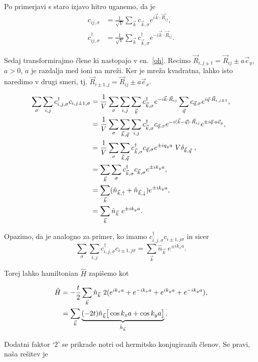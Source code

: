 \documentclass[a4paper, 12pt]{article}
\newcommand{\vq}{
	\ensuremath{\vec{q}}
}
\renewcommand{\u}{
	\ensuremath{\uparrow}
}
\renewcommand{\d}{
	\ensuremath{\downarrow}
}
\newcommand{\oh}{
	\ensuremath{\hat{h}}
}
\newcommand{\vk}{
	\ensuremath{\vec{k}}
}
\newcommand{\koren}{
	\ensuremath{\frac{1}{\sqrt{V}}}
}
\newcommand{\vR}{
	\ensuremath{\vec{R}_{ij}}
}
\newcommand{\s}{
	\ensuremath{\sigma}
}
\newcommand{\ey}{
	\ensuremath{\vec{e}_y}
}
\newcommand{\fV}{
	\ensuremath{\frac{1}{V}}
}
\renewcommand{\ni}{
	\noindent
}
\begin{document}
\ni Po primerjavi s staro izjavo hitro uganemo, da je
\begin{align}
	c_{ij,\sigma} &= \koren \sum_{\vk} c_{\vk,\sigma} e^{i\vk\cdot\vec{R}_{ij}}, \\
	c^\dagger_{ij,\sigma} &= \koren \sum_{\vk} c^\dagger_{\vk, \sigma} e^{-i\vk\cdot\vec{R}_{ij}}.
\end{align}

\ni Sedaj transformirajmo \v clene ki nastopajo v en.~\eqref{oh}. Recimo $\vec{R}_{i,j\pm1} = \vec{R}_{ij}
\pm a\vec{e}_y$, $a > 0$, $a$ je razdalja med ioni na mre\v zi. Ker je mre\v za kvadratna, lahko
isto naredimo v drugi smeri, tj. $\vec{R}_{i\pm1, j} = \vec{R}_{ij} \pm a\vec{e}_x$.

\begin{align}
	\sum_\s\sum_{i,j} c^\dagger_{i,j,\sigma}c_{i,j \pm 1,\sigma} 
	&=\fV \sum_\s\sum_{i,j}\sum_{\vk} c^\dagger_{\vk,\s} e^{-i\vk \cdot \vR}
		\sum_{\vq}c_{\vq,\s} e^{i\vq\cdot\vec{R}_{i,j \pm 1}}, \notag \\
	&=\fV \sum_\s \sum_{\vk,\vq} \sum_{i,j}c^\dagger_{\vk,\s} c_{\vq,\s} e^{-i(\vk - \vq)\cdot \vR}
		e^{\pm i\vq \cdot a \ey}, \notag \\
	&=\fV \sum_\s \sum_{\vk, \vq} c^\dagger_{\vk, \s} c_{\vq, \s} e^{\pm i q_y a}\ 
		V \delta_{\vk,\vq}\ ,\notag \\
	&= \sum_{\vk} \sum_\s c^\dagger_{\vk, \s} c_{\vk, \s} e^{\pm ik_y a}, \notag \\
	&= \sum_{\vk} (\hat{n}_{\vk,\u} + \hat{n}_{\vk,\d})e^{\pm ik_y a}, \notag \\
	&= \sum_{\vk} \hat{n}_{\vk}\ e^{\pm ik_y a}.
\end{align}

\ni Opazimo, da je analogno za primer, ko imamo $c^\dagger_{i,j,\s} c_{i\pm 1,j\s}$ in sicer
\begin{equation}
	\sum_\s \sum_{i,j} c^\dagger_{i,j,\s} c_{i\pm 1,j\s} = \sum_{\vk}
		\hat{n}_{\vk}\ e^{\pm ik_x a}.
\end{equation}

\ni Torej lahko hamiltonian $\hat{H}$ zapi\v semo kot

\begin{align}
	\hat{H} &= -\frac{t}{2} \sum_{\vk} \hat{n}_{\vk}\ 2(e^{ik_xa} + e^{-ik_xa} +
		e^{ik_ya} + e^{-ik_ya}), \notag \\
	&= \sum_{\vk} \underbrace{(-2t) \hat{n}_{\vk} \big[\cos k_xa + \cos k_ya \big]}_{\oh_{\vk}}.
\end{align}

\ni Dodatni faktor `$2$' se prikrade notri od hermitsko konjugiranih \v clenov. Se pravi, na\v sa
re\v sitev je
\end{document}
